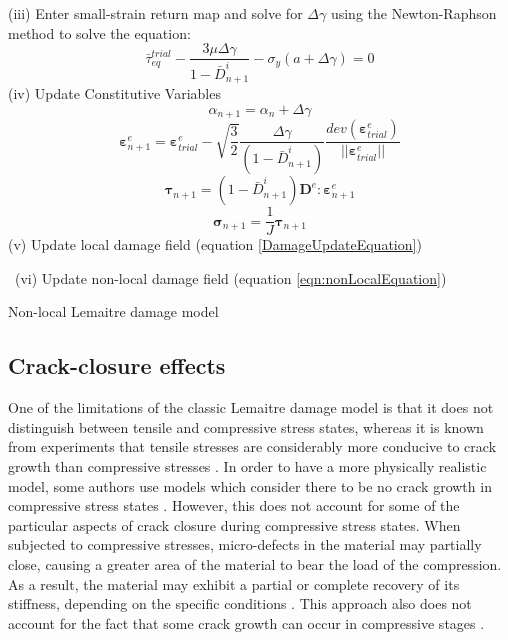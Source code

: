 \documentclass[sn-mathphys,Numbered,draft]{sn-jnl}%
\begin{document}
\begin{algorithm}[H]
(iii) Enter small-strain return map and solve for $\Delta\gamma$ using the Newton-Raphson method to solve the equation:
\begin{equation}
\bar{\tau}_{eq}^{trial}-\frac{3\mu\Delta\gamma}{1-\bar{D}^{i}_{n+1}}-\sigma_{y}(a+\Delta\gamma)=0\nonumber
\end{equation}
(iv) Update Constitutive Variables
\begin{equation}
\alpha_{n+1}=\alpha_n+\Delta\gamma\nonumber
\end{equation}
\begin{equation}
\boldsymbol{\varepsilon}^{e}_{n+1}=\boldsymbol{\varepsilon}^{e}_{trial}-\sqrt{\frac{3}{2}}\frac{\Delta\gamma}{\left(1-\bar{D}^{i}_{n+1}\right)}{\frac{dev(\boldsymbol{\varepsilon}^{e}_{trial})}{\lvert\lvert\boldsymbol{\varepsilon}^{e}_{trial}\rvert\rvert}}\nonumber
\end{equation}
\begin{equation}
\boldsymbol{\tau}_{n+1}=\left(1-\bar{D}^{i}_{n+1}\right)\mathbf{D}^e:\boldsymbol{\varepsilon}^{e}_{n+1}\nonumber
\end{equation}
\begin{equation}
\boldsymbol{\sigma}_{n+1}=\frac{1}{J}\boldsymbol{\tau}_{n+1}\nonumber
\end{equation}
(v) Update local damage field (equation \ref{DamageUpdateEquation})

\ (vi) Update non-local damage field (equation \ref{eqn:nonLocalEquation})
\caption{Non-local Lemaitre damage model}
\end{algorithm}

\subsection{Crack-closure effects}

One of the limitations of the classic Lemaitre damage model is that it does not distinguish between tensile and compressive stress states, whereas it is known from experiments that tensile stresses are considerably more conducive to crack growth than compressive stresses \cite{bao_cut-off_2005}. In order to have a more physically realistic model, some authors use models which consider there to be no crack growth in compressive stress states \cite{chu_void_1980}. However, this does not account for some of the particular aspects of crack closure during compressive stress states. When subjected to compressive stresses, micro-defects in the material may partially close, causing a greater area of the material to bear the load of the compression. As a result, the material may exhibit a partial or complete recovery of its stiffness, depending on the specific conditions \cite{teixeira_ductile_2010}. This approach also does not account for the fact that some crack growth can occur in compressive stages \cite{basic_finite_2005}.
\end{document}
